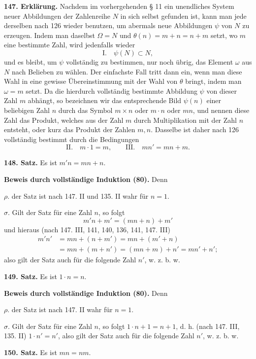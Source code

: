 \documentclass[11pt]{article}
\newcommand{\partof}{\mathrel{\subset}}
\begin{document}
\noindent\textbf{147. Erklärung.} Nachdem im vorhergehenden \S{} 11 ein unendliches System neuer Abbildungen der Zahlenreihe $N$ in sich selbst gefunden ist, kann man jede derselben nach 126 wieder benutzen, um abermals neue Abbildungen $\psi$ von $N$ zu erzeugen. Indem man daselbst $\Omega=N$ und $\theta(n)=m+n=n+m$ setzt, wo $m$ eine bestimmte Zahl, wird jedenfalls wieder
\[
\text{I.}\quad \psi(N)\partof N,
\]
und es bleibt, um $\psi$ vollständig zu bestimmen, nur noch übrig, das Element $\omega$ aus $N$ nach Belieben zu wählen. Der einfachste Fall tritt dann ein, wenn man diese Wahl in eine gewisse Übereinstimmung mit der Wahl von $\theta$ bringt, indem man $\omega=m$ setzt. Da die hierdurch vollständig bestimmte Abbildung $\psi$ von dieser Zahl $m$ abhängt, so bezeichnen wir das entsprechende Bild $\psi(n)$ einer beliebigen Zahl $n$ durch das Symbol $m\times n$ oder $m\cdot n$ oder $mn$, und nennen diese Zahl das Produkt, welches aus der Zahl $m$ durch Multiplikation mit der Zahl $n$ entsteht, oder kurz das Produkt der Zahlen $m,n$. Dasselbe ist daher nach 126 vollständig bestimmt durch die Bedingungen
\[
\text{II.}\quad m\cdot1=m,
\qquad
\text{III.}\quad mn'=mn+m.
\]

\noindent\textbf{148. Satz.} Es ist $m'n=mn+n$.

\noindent\textbf{Beweis durch vollständige Induktion (80).} Denn

\noindent $\rho.$ der Satz ist nach 147. II und 135. II wahr für $n=1$.

\noindent $\sigma.$ Gilt der Satz für eine Zahl $n$, so folgt
\[
m'n+m'=(mn+n)+m'
\]
und hieraus (nach 147. III, 141, 140, 136, 141, 147. III)
\begin{align*}
m'n'&=mn+(n+m')=mn+(m'+n)\\
&=mn+(m+n')=(mn+m)+n'=mn'+n';
\end{align*}
also gilt der Satz auch für die folgende Zahl $n'$, w. z. b. w.

\noindent\textbf{149. Satz.} Es ist $1\cdot n=n$.

\noindent\textbf{Beweis durch vollständige Induktion (80).} Denn

\noindent $\rho.$ der Satz ist nach 147. II wahr für $n=1$.

\noindent $\sigma.$ Gilt der Satz für eine Zahl $n$, so folgt $1\cdot n+1=n+1$, d. h. (nach 147. III, 135. II) $1\cdot n'=n'$, also gilt der Satz auch für die folgende Zahl $n'$, w. z. b. w.

\noindent\textbf{150. Satz.} Es ist $mn=nm$.
\end{document}
